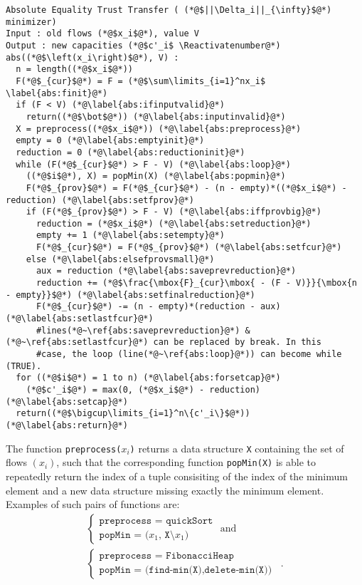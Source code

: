 \Suppressnumber
\begin{lstlisting}[label=abs, style=numbers]
Absolute Equality Trust Transfer ( (*@$||\Delta_i||_{\infty}$@*) minimizer)
Input : old flows (*@$x_i$@*), value V
Output : new capacities (*@$c'_i$ \Reactivatenumber@*)
abs((*@$\left(x_i\right)$@*), V) :
  n = length((*@$x_i$@*))
  F(*@$_{cur}$@*) = F = (*@$\sum\limits_{i=1}^nx_i$ \label{abs:finit}@*)
  if (F < V) (*@\label{abs:ifinputvalid}@*)
    return((*@$\bot$@*)) (*@\label{abs:inputinvalid}@*)
  X = preprocess((*@$x_i$@*)) (*@\label{abs:preprocess}@*)
  empty = 0 (*@\label{abs:emptyinit}@*)
  reduction = 0 (*@\label{abs:reductioninit}@*)
  while (F(*@$_{cur}$@*) > F - V) (*@\label{abs:loop}@*)
    ((*@$i$@*), X) = popMin(X) (*@\label{abs:popmin}@*)
    F(*@$_{prov}$@*) = F(*@$_{cur}$@*) - (n - empty)*((*@$x_i$@*) - reduction) (*@\label{abs:setfprov}@*)
    if (F(*@$_{prov}$@*) > F - V) (*@\label{abs:iffprovbig}@*)
      reduction = (*@$x_i$@*) (*@\label{abs:setreduction}@*)
      empty += 1 (*@\label{abs:setempty}@*)
      F(*@$_{cur}$@*) = F(*@$_{prov}$@*) (*@\label{abs:setfcur}@*)
    else (*@\label{abs:elsefprovsmall}@*)
      aux = reduction (*@\label{abs:saveprevreduction}@*)
      reduction += (*@$\frac{\mbox{F}_{cur}\mbox{ - (F - V)}}{\mbox{n - empty}}$@*) (*@\label{abs:setfinalreduction}@*)
      F(*@$_{cur}$@*) -= (n - empty)*(reduction - aux) (*@\label{abs:setlastfcur}@*)
      #lines(*@~\ref{abs:saveprevreduction}@*) &(*@~\ref{abs:setlastfcur}@*) can be replaced by break. In this
      #case, the loop (line(*@~\ref{abs:loop}@*)) can become while (TRUE).
  for ((*@$i$@*) = 1 to n) (*@\label{abs:forsetcap}@*)
    (*@$c'_i$@*) = max(0, (*@$x_i$@*) - reduction) (*@\label{abs:setcap}@*)
  return((*@$\bigcup\limits_{i=1}^n\{c'_i\}$@*)) (*@\label{abs:return}@*)
\end{lstlisting}

The function \texttt{preprocess(}$x_i$\texttt{)} returns a data structure \texttt{X} containing the set of flows
$\left(x_i\right)$, such that the corresponding function \texttt{popMin(X)} is able to repeatedly return the index of a tuple
consisiting of the index of the minimum element and a new data structure missing exactly the minimum element. Examples of
such pairs of functions are:
\begin{equation*}
\begin{gathered}
  \begin{cases}
    \texttt{preprocess = quickSort} \\
    \texttt{popMin = (}x_1\texttt{, X}\setminus x_1\texttt{)}
  \end{cases}
  \mbox{ and} \\
  \begin{cases}
    \texttt{preprocess = FibonacciHeap} \\
    \texttt{popMin = (find-min(X),delete-min(X))}
  \end{cases} \enspace.
\end{gathered}
\end{equation*}

